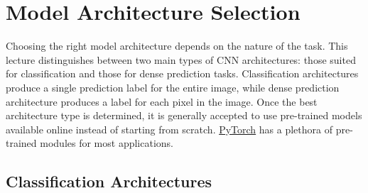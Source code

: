 \documentclass{article}
\begin{document}


\section{Model Architecture Selection}
Choosing the right model architecture depends on the nature of the task. This lecture distinguishes between two main types of CNN architectures: those suited for classification and those for dense prediction tasks. Classification architectures produce a single prediction label for the entire image, while dense prediction architecture produces a label for each pixel in the image. Once the best architecture type is determined, it is generally accepted to use pre-trained models available online instead of starting from scratch. \href{https://pytorch.org/vision/stable/models.html}{PyTorch} has a plethora of pre-trained modules for most applications.

\subsection{Classification Architectures}
\end{document}
